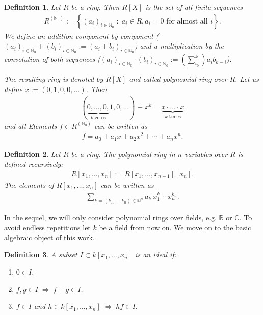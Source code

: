 \documentclass[11pt,a4paper]{scrreprt}
\newtheorem{defn}{Definition}
\newcommand{\R}{\mathbb{R}}
\newcommand{\C}{\mathbb{C}}
\newcommand{\N}{\mathbb{N}}
\newcommand{\mvar}[2]{#1_1,\ldots , #1_{#2}}
\begin{document}
\begin{defn}
Let $R$ be a ring. Then $R[X]$ is the set of all finite sequences 
\begin{align*}
R^{(\N_0)} := 
\left\lbrace (a_i)_{i\in\N_0} \; : \;  a_i \in R, a_i=0 \text{ for almost all } i \right\rbrace.
\end{align*}
We define an addition component-by-component ($(a_i)_{i\in \N_0} + (b_i)_{i\in \N_0} := (a_i + b_i)_{i\in \N_0}$) and a multiplication by the convolution of both sequences ($(a_i)_{i\in \N_0} \cdot (b_i)_{i\in \N_0} := (\sum_{i_0}^k) a_i b_{k-i}$).

The resulting ring is denoted by $R[X]$ and called \emph{polynomial ring over $R$}. Let us define $x := (0,1,0,0,\ldots)$. Then 
\begin{align*}
(\underbrace{0, \ldots , 0,}_{k \text{ zeros}} 1, 0, \ldots ) \equiv x^k = \underbrace{x \cdot \ldots \cdot x}_{k\text{ times}}
\end{align*}
and all Elements $f\in R^{(\N_0)}$ can be written as
\begin{align*}
f = a_0 + a_1 x + a_2 x^2 + \cdots + a_n x^n.
\end{align*}
\end{defn}

\begin{defn}
Let $R$ be a ring. The \emph{polynomial ring in $n$ variables over $R$} is defined recursively:
\begin{align*}
R[\mvar{x}{n}] := R[\mvar{x}{n-1}] [x_n].
\end{align*}
The elements of $R[\mvar{x}{n}] $ can be written as 
\begin{align*}
\sum_{k = (\mvar{k}{n}) \in \N^n} a_k \: x_1^{k_1} \cdots x_n^{k_n}.
\end{align*}
\end{defn}

In the sequel, we will only consider polynomial rings over fields, e.g. $\R$ or $\C$. To avoid endless repetitions let $k$ be a field from now on. We move on to the basic algebraic object of this work.

\begin{defn}
A subset $I\subset k[\mvar{x}{n}]$ is an \emph{ideal} if:
\begin{enumerate}
\item $0 \in I$.
\item $f,g\in I \;\Rightarrow \; f+g\in I$.
\item $f\in I$ and $h\in k[\mvar{x}{n}] \;\Rightarrow\; hf\in I$.
\end{enumerate}
\end{defn}
\end{document}

